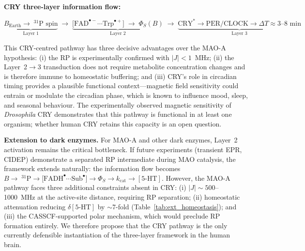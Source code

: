 \documentclass[11pt]{article}
\begin{document}
\textbf{CRY three-layer information flow:}
\begin{center}
\small
$\underbrace{B_\mathrm{Earth} \to \;^{31}\mathrm{P}\text{ spin}}_{\text{Layer 1}} \;\longrightarrow\; \underbrace{\mathrm{[FAD}^{\bullet-}\cdots\mathrm{Trp}^{\bullet+}\mathrm{]} \;\to\; \Phi_S(B)}_{\text{Layer 2}} \;\longrightarrow\; \underbrace{\mathrm{CRY}^* \to \mathrm{PER/CLOCK} \to \Delta T \approx 3\text{--}8\text{ min}}_{\text{Layer 3}}$
\end{center}

This CRY-centred pathway has three decisive advantages over the MAO-A hypothesis: (i) the RP is experimentally confirmed with $|J| < 1$~MHz\cite{Xu2021,Hiscock2016}; (ii) the Layer~2$\to$3 transduction does not require metabolite concentration changes and is therefore immune to homeostatic buffering; and (iii) CRY's role in circadian timing provides a plausible functional context---magnetic field sensitivity could entrain or modulate the circadian phase, which is known to influence mood, sleep, and seasonal behaviour. The experimentally observed magnetic sensitivity of \textit{Drosophila} CRY\cite{Xu2021} demonstrates that this pathway is functional in at least one organism; whether human CRY retains this capacity is an open question.

\textbf{Extension to dark enzymes.} For MAO-A and other dark enzymes, Layer~2 activation remains the critical bottleneck. If future experiments (transient EPR, CIDEP) demonstrate a separated RP intermediate during MAO catalysis, the framework extends naturally: the information flow becomes $B \to \;^{31}\mathrm{P} \to \mathrm{[FADH}^{\bullet}\cdots\mathrm{Sub}^{\bullet}\mathrm{]} \to \Phi_S \to k_\mathrm{cat} \to [\text{5-HT}]$. However, the MAO-A pathway faces three additional constraints absent in CRY: (i) $|J| \sim 500$--1000~MHz at the active-site distance, requiring RP separation; (ii) homeostatic attenuation reducing $\delta[\text{5-HT}]$ by $\sim$7-fold (Table~\ref{tab:ext_homeostasis}); and (iii) the CASSCF-supported polar mechanism, which would preclude RP formation entirely. We therefore propose that the CRY pathway is the only currently defensible instantiation of the three-layer framework in the human brain.
\end{document}
